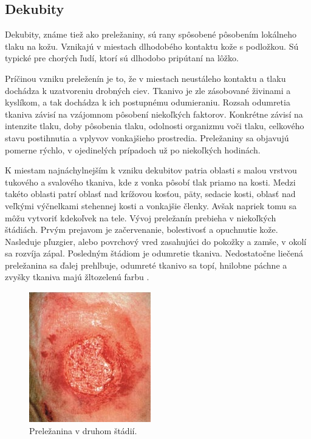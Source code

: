 \subsection{Dekubity}
Dekubity, známe tiež ako preležaniny, sú rany spôsobené pôsobením lokálneho tlaku na kožu. Vznikajú v miestach dlhodobého kontaktu kože s podložkou. Sú typické pre chorých ľudí, ktorí sú dlhodobo pripútaní na lôžko.

Príčinou vzniku preleženín je to, že v miestach neustáleho kontaktu a tlaku dochádza k uzatvoreniu drobných ciev. Tkanivo je zle zásobované živinami a kyslíkom, a tak dochádza k ich postupnému odumieraniu. Rozsah odumretia tkaniva závisí na vzájomnom pôsobení niekoľkých faktorov. Konkrétne závisí na intenzite tlaku, doby pôsobenia tlaku, odolnosti organizmu voči tlaku, celkového stavu postihnutia a vplyvov vonkajšieho prostredia. Preležaniny sa objavujú pomerne rýchlo, v ojedinelých prípadoch už po niekoľkých hodinách.

K miestam najnáchylnejším k vzniku dekubitov patria oblasti s malou vrstvou tukového a svalového tkaniva, kde z vonka pôsobí tlak priamo na kosti. Medzi takéto oblasti patrí oblasť nad krížovou kosťou, päty, sedacie kosti, oblasť nad veľkými výčnelkami stehennej kosti a vonkajšie členky. Avšak napriek tomu sa môžu vytvoriť kdekoľvek na tele. Vývoj preležanín prebieha v niekoľkých štádiách. Prvým prejavom je začervenanie, bolestivosť a opuchnutie kože. Nasleduje pľuzgier, alebo povrchový vred zasahujúci do pokožky a zamše, v okolí sa rozvíja zápal. Posledným štádiom je odumretie tkaniva. Nedostatočne liečená preležanina sa ďalej prehlbuje, odumreté tkanivo sa topí, hnilobne páchne a zvyšky tkaniva majú žltozelenú farbu \cite{pcCdSrbbhhlr5YcQ, Hlinkova2015}.
\begin{figure}[h]
  \centering
  \includegraphics[scale=1]{fig/dekubit.png}
  \caption{Preležanina v druhom štádií. \cite{Vilimovsky2015}}
  \label{fig:dekubit}
\end{figure}

